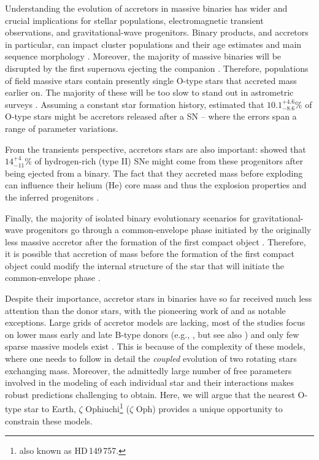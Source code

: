 \documentclass[twocolumn,twocolappendix,trackchanges]{aastex63}
\newcommand{\zoph}{$\zeta$ Oph}
\begin{document}
Understanding the evolution of accretors in massive binaries has wider
and crucial implications for stellar populations, electromagnetic
transient observations, and gravitational-wave progenitors. Binary
products, and accretors in particular, can impact cluster populations
and their age estimates and main sequence morphology
\citep[e.g.,][]{pols_marinus:94, wang:20}. Moreover, the majority of
massive binaries will be disrupted by the first supernova ejecting the
companion \citep[``binary SN scenario'', ][]{blaauw:61, dedonder:97,
  eldridge:11, renzo:19walk, evans:20}. Therefore, populations of
field massive stars contain presently single O-type stars that
accreted mass earlier on. The majority of these will be too slow to
stand out in astrometric surveys \citep[e.g.,][]{eldridge:11,
  renzo:19walk}. Assuming a constant star formation
history, \cite{renzo:19walk} estimated that $10.1^{+4.6}_{-8.6}\%$ of
O-type stars might be accretors released after a SN -- where the
errors span a range of parameter variations.

From the transients
perspective, accretors stars are also important: \cite{zapartas:19}
showed that $14_{-11}^{+4}\%$ of hydrogen-rich (type II) SNe might
come from these progenitors after being ejected from a binary. The
fact that they accreted mass before exploding can influence their
helium (He) core mass and thus the explosion properties and the
inferred progenitors \citep{zapartas:21}.

Finally, the majority of
isolated binary evolutionary scenarios for gravitational-wave
progenitors go through a common-envelope phase initiated by the
originally less massive accretor after the formation of the first
compact object \citep[e.g.,][]{belczynski:16nat, tauris:17,
  broekgaarden:21}. Therefore, it is possible that accretion of mass
before the formation of the first compact object could modify the
internal structure of the star that will initiate the common-envelope
phase \citep[e.g.][]{law-smith:20, klencki:21}.

Despite their importance, accretor stars in binaries have so far
received much less attention than the donor stars, with the pioneering
work of \cite{hellings:83, hellings:84} and \cite{braun:95} as notable
exceptions. Large grids of accretor models are lacking, most of the
studies focus on lower mass early and late B-type donors
(e.g., \citealt{vanrensbergen:06, vanrensbergen:11}, but see also
\citealt{wang:20})  and only
few sparse massive models exist \citep[e.g.,][]{cantiello:07}. This is because of the complexity of these models, where one
needs to follow in detail the \emph{coupled} evolution of two rotating
stars exchanging mass. Moreover, the admittedly large number of free
parameters involved in the modeling of each individual star and their
interactions makes robust predictions challenging to obtain. Here, we
will argue that the nearest O-type star to Earth, $\zeta$
Ophiuchi\footnote{also known as HD\,149\,757.} (\zoph) provides a unique
opportunity to constrain these models.
\end{document}
